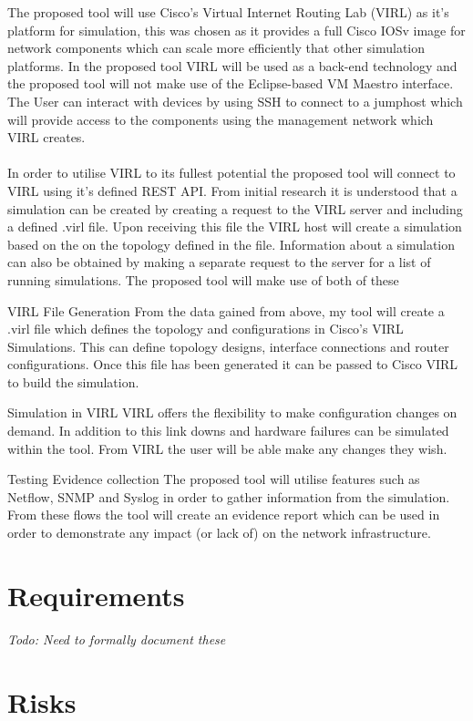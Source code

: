 \documentclass[11pt]{report}
\begin{document}
The proposed tool will use Cisco's Virtual Internet Routing Lab (VIRL) as it's platform for simulation, this was chosen as it provides a full Cisco IOSv image for network components which can scale more efficiently that other simulation platforms. In the proposed tool VIRL will be used as a back-end technology and the proposed tool will not make use of the Eclipse-based VM Maestro interface. The User can interact with devices by using SSH to connect to a jumphost which will provide access to the components using the management network which VIRL creates. 
\\
\\
In order to utilise VIRL to its fullest potential the proposed tool will connect to VIRL using it's defined REST API. From initial research it is understood that a simulation can be created by creating a request to the VIRL server and including a defined .virl file. Upon receiving this file the VIRL host will create a simulation based on the on the topology defined in the file. Information about a simulation can also be obtained by making a separate request to the server for a list of running simulations. The proposed tool will make use of both of these 
      
VIRL File Generation
From the data gained from above, my tool will create a .virl file which defines the topology and configurations in Cisco’s VIRL Simulations. This can define topology designs, interface connections and router configurations. Once this file has been generated it can be passed to Cisco VIRL to build the simulation.

Simulation in VIRL
VIRL offers the flexibility to make configuration changes on demand. In addition to this link downs and hardware failures can be simulated within the tool. From VIRL the user will be able make any changes they wish.

Testing Evidence collection
The proposed tool will utilise features such as Netflow, SNMP and Syslog in order to gather information from the simulation. From these flows the tool will create an evidence report which can be used in order to demonstrate any impact (or lack of) on the network infrastructure.

\section{Requirements}

\textit{Todo: Need to formally document these}

\section{Risks}
\end{document}
